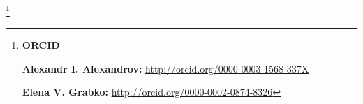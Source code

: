 \renewcommand{\baselinestretch}{0.87}



\newpage







\makeentitle



\Russian





\thanks{{\bf ORCID}



{\bf Alexandr I. Alexandrov:} \url{http://orcid.org/0000-0003-1568-337X}



{\bf Elena V. Grabko:} \url{http://orcid.org/0000-0002-0874-8326}

}







\EngRef




